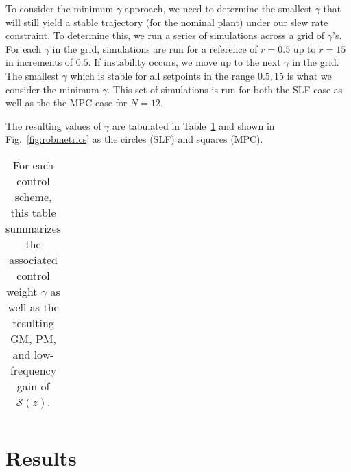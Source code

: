 \documentclass[twocolumn,twoside]{IEEEtran}
\begin{document}
To consider the minimum-$\gamma$ approach, we need to determine the smallest $\gamma$ that will still yield a stable trajectory (for the nominal plant) under our slew rate constraint. To determine this, we run a series of simulations across a grid of $\gamma$'s. For each $\gamma$ in the grid, simulations are run for a reference of $r=0.5$ up to $r=15$ in increments of $0.5$. If instability occurs, we move up to the next $\gamma$ in the grid. The smallest $\gamma$ which is stable for all setpoints in the range $0.5, 15$ is what we consider the minimum $\gamma$. This set of simulations is run for both the SLF case as well as the the MPC case for $N=12$.

The resulting values of $\gamma$ are tabulated in Table~\ref{tab:gmpms} and shown in Fig.~\ref{fig:robmetrics} as the circles (SLF) and squares (MPC).

\begin{table}
  \caption{For each control scheme, this table summarizes the associated control weight $\gamma$ as well as the resulting GM, PM, and low-frequency gain of $\mathcal{S}(z)$.}
  \label{tab:gmpms}
  \begin{tabular}{ccccc}
    
  \end{tabular}
\end{table}

\section{Results}\label{sec:results}
%     
%     
\end{document}
